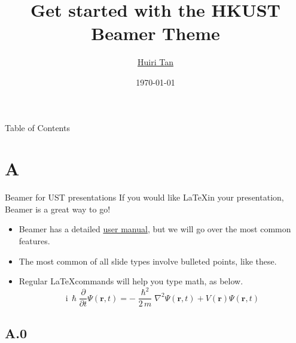 \documentclass[]{beamer}
\title{Get started with the HKUST Beamer Theme}
\subtitle{}
\author{\href{mailto:hr.tan@connect.ust.hk}{Huiri Tan}}
\date{\today}
\newcommand{\hrefcol}[2]{\textcolor{uihteal}{\href{#1}{#2}}}
\begin{document}
\maketitle
{} %


\begin{frame}[t]{Table of Contents}
    \begin{multicols}{2}  %
        \tableofcontents
    \end{multicols}
\end{frame}


\section{A}


\begin{frame}{Beamer for UST presentations}
If you would like \LaTeX in your presentation, Beamer is a great way to go!
\begin{itemize}
\item Beamer has a detailed
\hrefcol{https://www.ctan.org/tex-archive/macros/latex/contrib/beamer/doc/beameruserguide.pdf}{user
 manual}, but we will go over the most common features.
\item The most common of all slide types involve bulleted points, like these.
\item Regular \LaTeX commands will help you type math, as below.
\begin{equation*}
\mathrm{i}\,\hslash\frac{\partial}{\partial t} \Psi(\mathbf{r},t) = -\frac{\hslash^2}{2\,m}\nabla^2\Psi(\mathbf{r},t) + V(\mathbf{r})\Psi(\mathbf{r},t)
\end{equation*}
\end{itemize}
\end{frame}

\subsection{A.0}
\end{document}
